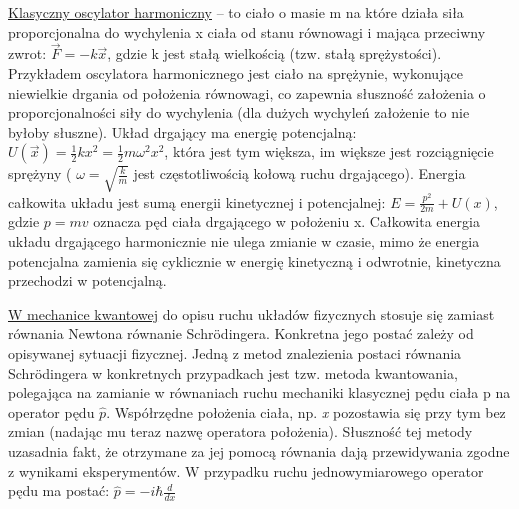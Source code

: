 \underline{Klasyczny oscylator harmoniczny} – to ciało o masie m na które działa siła proporcjonalna do wychylenia x ciała od stanu równowagi i mająca przeciwny zwrot:\newline
$ \vec{F} = -k\vec{x} $,\newline
gdzie k jest stałą wielkością (tzw. stałą sprężystości). Przykładem oscylatora harmonicznego jest ciało na sprężynie, wykonujące niewielkie drgania od położenia równowagi, co zapewnia słuszność założenia o proporcjonalności siły do wychylenia (dla dużych wychyleń założenie to nie byłoby słuszne). Układ drgający ma energię potencjalną:\newline
$ U(\vec{x}) = \frac{1}{2}kx^2 = \frac{1}{2}m\omega^2x^2 $,\newline
która jest tym większa, im większe jest rozciągnięcie sprężyny ( $\omega = \sqrt{\frac{k}{m}} $ jest częstotliwością kołową ruchu drgającego). Energia całkowita układu jest sumą energii kinetycznej i potencjalnej: \newline
$ E = \frac{p^2}{2m} + U(x) $,\newline
gdzie $ p = mv $ oznacza pęd ciała drgającego w położeniu x. Całkowita energia układu drgającego harmonicznie nie ulega zmianie w czasie, mimo że energia potencjalna zamienia się cyklicznie w energię kinetyczną i odwrotnie, kinetyczna przechodzi w potencjalną.

\underline{W mechanice kwantowej} do opisu ruchu układów fizycznych stosuje się zamiast równania Newtona równanie Schrödingera. Konkretna jego postać zależy od opisywanej sytuacji fizycznej. Jedną z metod znalezienia postaci równania Schrödingera w konkretnych przypadkach jest tzw. metoda kwantowania, polegająca na zamianie w równaniach ruchu mechaniki klasycznej pędu ciała p na operator pędu $ \hat{p} $. Współrzędne położenia ciała, np. \textit{x} pozostawia się przy tym bez zmian (nadając mu teraz nazwę operatora położenia). Słuszność tej metody uzasadnia fakt, że otrzymane za jej pomocą równania dają przewidywania zgodne z wynikami eksperymentów. W przypadku ruchu jednowymiarowego operator pędu ma postać:\newline
$ \hat{p} = -i\hbar\frac{d}{dx} $

